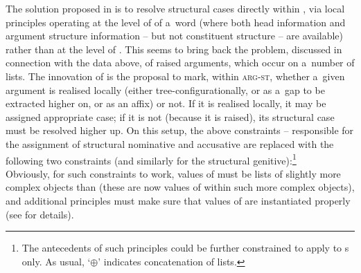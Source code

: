 \documentclass[output=paper
                ,modfonts
                ,nonflat
	        ,collection
	        ,collectionchapter
	        ,collectiontoclongg
 	        ,biblatex
                ,babelshorthands
                ,newtxmath
                ,draftmode
                ,colorlinks, citecolor=brown
]{./langsci/langscibook}
\begin{document}
The solution proposed in \citet{prze:96,Prze99b,Prze99} is to resolve structural cases directly within , via local principles operating at the level of  of a~word (where both head information and argument structure information – but not constituent structure – are available) rather than at the level of .  This seems to bring back the problem, discussed in connection with the  data above, of raised arguments, which occur on a~number of  lists.  The innovation of \citet{prze:96,Prze99b,Prze99} is the proposal to mark, within \textsc{arg-st}, whether a~given argument is realised locally (either tree-con\-fi\-gu\-ra\-tio\-nal\-ly, or as a~gap to be extracted higher on, or as an affix) or not.  If it is realised locally, it may be assigned appropriate case; if it is not (because it is raised), its structural case must be resolved higher up.  On this setup, the above constraints – responsible for the assignment of structural nominative and accusative are replaced with the following two constraints (and similarly for the structural genitive):\footnote{The antecedents of such principles could be further constrained to apply to s only. As usual, `$\oplus$' indicates concatenation of lists.}
\ea
\label{nonc:cp:germ1}
  \impl 
\z
\ea \label{nonc:cp:germ2}
  \impl\\ 
\z
Obviously, for such constraints to work, values of  must be lists of slightly more complex objects than  (these are now values of  within such more complex objects), and additional principles must make sure that values of  are instantiated properly (see \citealt[78–79]{Prze99b} for details).
\end{document}
